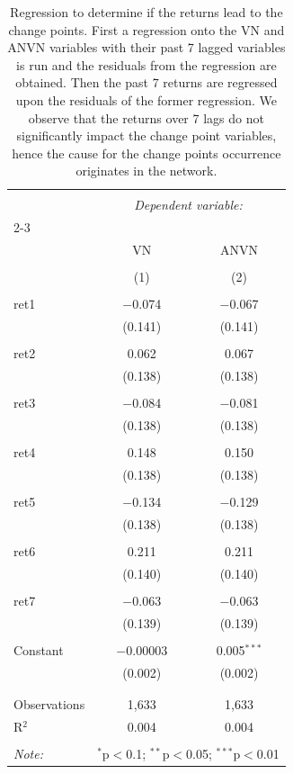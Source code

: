 
\begin{table}[!htbp] \centering 
  \caption{Regression to determine if the returns lead to the change points. First a regression 
onto the VN and ANVN variables with their past 7 lagged variables is run and the residuals from the regression are obtained. 
Then the past 7 returns are regressed upon the residuals of the former regression. We observe that the returns over 7 lags 
do not significantly impact the change point variables, hence the cause for the change points occurrence originates in the 
network.} 
  \label{VN_NVN_reg_robust} 
\scriptsize 
\begin{tabular}{@{\extracolsep{5pt}}lcc} 
\\[-1.8ex]\hline 
\hline \\[-1.8ex] 
 & \multicolumn{2}{c}{\textit{Dependent variable:}} \\ 
\cline{2-3} 
\\[-1.8ex] & VN & ANVN \\ 
\\[-1.8ex] & (1) & (2)\\ 
\hline \\[-1.8ex] 
 ret1 & $-$0.074 & $-$0.067 \\ 
  & (0.141) & (0.141) \\ 
  & & \\ 
 ret2 & 0.062 & 0.067 \\ 
  & (0.138) & (0.138) \\ 
  & & \\ 
 ret3 & $-$0.084 & $-$0.081 \\ 
  & (0.138) & (0.138) \\ 
  & & \\ 
 ret4 & 0.148 & 0.150 \\ 
  & (0.138) & (0.138) \\ 
  & & \\ 
 ret5 & $-$0.134 & $-$0.129 \\ 
  & (0.138) & (0.138) \\ 
  & & \\ 
 ret6 & 0.211 & 0.211 \\ 
  & (0.140) & (0.140) \\ 
  & & \\ 
 ret7 & $-$0.063 & $-$0.063 \\ 
  & (0.139) & (0.139) \\ 
  & & \\ 
 Constant & $-$0.00003 & 0.005$^{***}$ \\ 
  & (0.002) & (0.002) \\ 
  & & \\ 
\hline \\[-1.8ex] 
Observations & 1,633 & 1,633 \\ 
R$^{2}$ & 0.004 & 0.004 \\ 
\hline 
\hline \\[-1.8ex] 
\textit{Note:}  & \multicolumn{2}{r}{$^{*}$p$<$0.1; $^{**}$p$<$0.05; $^{***}$p$<$0.01} \\ 
\end{tabular} 
\end{table} 
